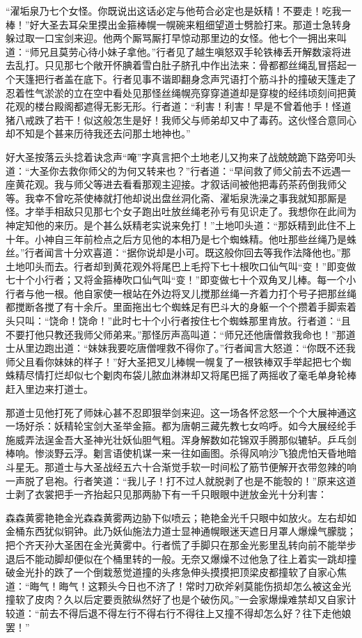 \documentclass[12pt,UTF8]{ctexbook}
\begin{document}
“濯垢泉乃七个女怪。你既说出这话必定与他苟合必定也是妖精！不要走！吃我一棒！”好大圣去耳朵里摸出金箍棒幌一幌碗来粗细望道士劈脸打来。那道士急转身躲过取一口宝剑来迎。他两个厮骂厮打早惊动那里边的女怪。他七个一拥出来叫道：“师兄且莫劳心待小妹子拿他。”行者见了越生嗔怒双手轮铁棒丢开解数滚将进去乱打。只见那七个敞开怀腆着雪白肚子脐孔中作出法来：骨都都丝绳乱冒搭起一个天篷把行者盖在底下。行者见事不谐即翻身念声咒语打个筋斗扑的撞破天篷走了忍着性气淤淤的立在空中看处见那怪丝绳幌亮穿穿道道却是穿梭的经纬顷刻间把黄花观的楼台殿阁都遮得无影无形。行者道：“利害！利害！早是不曾着他手！怪道猪八戒跌了若干！似这般怎生是好！我师父与师弟却又中了毒药。这伙怪合意同心却不知是个甚来历待我还去问那土地神也。”

好大圣按落云头捻着诀念声“唵”字真言把个土地老儿又拘来了战兢兢跪下路旁叩头道：“大圣你去救你师父的为何又转来也？”行者道：“早间救了师父前去不远遇一座黄花观。我与师父等进去看看那观主迎接。才叙话间被他把毒药茶药倒我师父等。我幸不曾吃茶使棒就打他却说出盘丝洞化斋、濯垢泉洗澡之事我就知那厮是怪。才举手相敌只见那七个女子跑出吐放丝绳老孙亏有见识走了。我想你在此间为神定知他的来历。是个甚么妖精老实说来免打！”土地叩头道：“那妖精到此住不上十年。小神自三年前检点之后方见他的本相乃是七个蜘蛛精。他吐那些丝绳乃是蛛丝。”行者闻言十分欢喜道：“据你说却是小可。既这般你回去等我作法降他也。”那土地叩头而去。行者却到黄花观外将尾巴上毛捋下七十根吹口仙气叫“变！”即变做七十个小行者；又将金箍棒吹口仙气叫“变！”即变做七十个双角叉儿棒。每一个小行者与他一根。他自家使一根站在外边将叉儿搅那丝绳一齐着力打个号子把那丝绳都搅断各搅了有十余斤。里面拖出七个蜘蛛足有巴斗大的身躯一个个攒着手脚索着头只叫：“饶命！饶命！”此时七十个小行者按住七个蜘蛛那里肯放。行者道：“且不要打他只教还我师父师弟来。”那怪厉声高叫道：“师兄还他唐僧救我命也！”那道士从里边跑出道：“妹妹我要吃唐僧哩救不得你了。”行者闻言大怒道：“你既不还我师父且看你妹妹的样子！”好大圣把叉儿棒幌一幌复了一根铁棒双手举起把七个蜘蛛精尽情打烂却似七个劖肉布袋儿脓血淋淋却又将尾巴摇了两摇收了毫毛单身轮棒赶入里边来打道士。

那道士见他打死了师妹心甚不忍即狠举剑来迎。这一场各怀忿怒一个个大展神通这一场好杀：妖精轮宝剑大圣举金箍。都为唐朝三藏先教七女呜呼。如今大展经纶手施威弄法逞金吾大圣神光壮妖仙胆气粗。浑身解数如花锦双手腾那似辘轳。乒乓剑棒响。惨淡野云浮。劖言语使机谋一来一往如画图。杀得风响沙飞狼虎怕天昏地暗斗星无。那道士与大圣战经五六十合渐觉手软一时间松了筋节便解开衣带忽辣的响一声脱了皂袍。行者笑道：“我儿子！打不过人就脱剥了也是不能彀的！”原来这道士剥了衣裳把手一齐抬起只见那两胁下有一千只眼眼中迸放金光十分利害：

森森黄雾艳艳金光森森黄雾两边胁下似喷云；艳艳金光千只眼中如放火。左右却如金桶东西犹似铜钟。此乃妖仙施法力道士显神通幌眼迷天遮日月罩人爆燥气朦胧；把个齐天孙大圣困在金光黄雾中。行者慌了手脚只在那金光影里乱转向前不能举步退后不能动脚却便似在个桶里转的一般。无奈又爆燥不过他急了往上着实一跳却撞破金光扑的跌了一个倒栽葱觉道撞的头疼急伸头摸摸把顶梁皮都撞软了自家心焦道：“晦气！晦气！这颗头今日也不济了！常时刀砍斧剁莫能伤损却怎么被这金光撞软了皮肉？久以后定要贡脓纵然好了也是个破伤风。”一会家爆燥难禁却又自家计较道：“前去不得后退不得左行不得右行不得往上又撞不得却怎么好？往下走他娘罢！”
\end{document}
